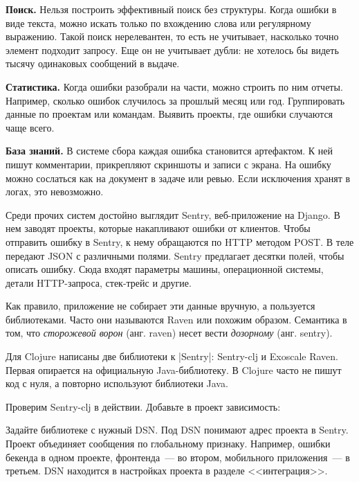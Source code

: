 \textbf{Поиск.} Нельзя построить эффективный поиск без структуры. Когда ошибки в
виде текста, можно искать только по вхождению слова или регулярному
выражению. Такой поиск нерелевантен, то есть не учитывает, насколько точно
элемент подходит запросу. Еще он не учитывает дубли: не хотелось бы видеть
тысячу одинаковых сообщений в выдаче.

\textbf{Статистика.} Когда ошибки разобрали на части, можно строить по ним
отчеты. Например, сколько ошибок случилось за прошлый месяц или
год. Группировать данные по проектам или командам. Выявить проекты, где ошибки
случаются чаще всего.

\textbf{База знаний.} В системе сбора каждая ошибка становится артефактом. К ней
пишут комментарии, прикрепляют скриншоты и записи с экрана. На ошибку можно
сослаться как на документ в задаче или ревью. Если исключения хранят в логах,
это невозможно.

Среди прочих систем достойно выглядит Sentry,
веб-приложение на Django. В нем заводят проекты, которые накапливают ошибки от
клиентов. Чтобы отправить ошибку в Sentry, к нему обращаются по HTTP методом
POST. В теле передают JSON с различными полями. Sentry предлагает десятки полей,
чтобы описать ошибку. Сюда входят параметры машины, операционной системы, детали
HTTP-запроса, стек-трейс и другие.

Как правило, приложение не собирает эти данные вручную, а пользуется
библиотеками. Часто они называются Raven или похожим образом. Семантика в том,
что \emph{сторожевой ворон} (анг. raven) несет вести \emph{дозорному}
(анг. sentry).

Для Clojure написаны две библиотеки к \spverb|Sentry|:
Sentry-clj и Exoscale
Raven. Первая опирается на
официальную Java-библиотеку. В Clojure часто не пишут код с нуля, а повторно
используют библиотеки Java.

Проверим Sentry-clj в действии. Добавьте в проект зависимость:

\begin{english}
  \begin{clojure}
  \end{clojure}
\end{english}

Задайте библиотеке с нужный DSN. Под DSN понимают адрес проекта в Sentry. Проект
объединяет сообщения по глобальному признаку. Например, ошибки бекенда в одном
проекте, фронтенда~--- во втором, мобильного приложения~--- в третьем. DSN
находится в настройках проекта в разделе <<интеграция>>.

